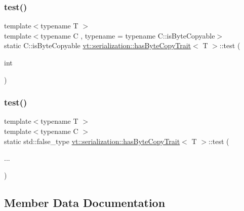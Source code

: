 \subsubsection{\texorpdfstring{test()}{test()}\hspace{0.1cm}{\footnotesize\ttfamily [1/2]}}
{\footnotesize\ttfamily template$<$typename T $>$ \\
template$<$typename C , typename  = typename C\+::is\+Byte\+Copyable$>$ \\
static C\+::is\+Byte\+Copyable \hyperlink{structvt_1_1serialization_1_1has_byte_copy_trait}{vt\+::serialization\+::has\+Byte\+Copy\+Trait}$<$ T $>$\+::test (\begin{DoxyParamCaption}\item[{int}]{ }\end{DoxyParamCaption})\hspace{0.3cm}{\ttfamily [static]}}

\mbox{\label{structvt_1_1serialization_1_1has_byte_copy_trait_a16ee865dfb170e91f41e16de170b835e}} 
\subsubsection{\texorpdfstring{test()}{test()}\hspace{0.1cm}{\footnotesize\ttfamily [2/2]}}
{\footnotesize\ttfamily template$<$typename T $>$ \\
template$<$typename C $>$ \\
static std\+::false\+\_\+type \hyperlink{structvt_1_1serialization_1_1has_byte_copy_trait}{vt\+::serialization\+::has\+Byte\+Copy\+Trait}$<$ T $>$\+::test (\begin{DoxyParamCaption}\item[{}]{... }\end{DoxyParamCaption})\hspace{0.3cm}{\ttfamily [static]}}



\subsection{Member Data Documentation}
\mbox{\label{structvt_1_1serialization_1_1has_byte_copy_trait_ab0e433e90af4c3f2b8b6353fb2bbd34c}} 
